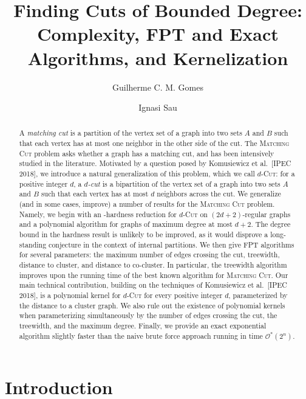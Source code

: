 \documentclass[a4paper,UKenglish,cleveref, autoref]{lipics-v2019}
\title{Finding Cuts of Bounded Degree: Complexity, FPT and Exact Algorithms, and Kernelization}
\author{Guilherme C. M. Gomes}{Universidade Federal de Minas Gerais, \and Departamento de Ciência da Computação, Belo Horizonte, Brazil}{gcm.gomes@dcc.ufmg.br}{https://orcid.org/0000-0002-5164-1460
}{Coordenação de Aperfeiçoamento de Pessoal de Nível Superior - Brasil (CAPES) - Finance Code 001.}%
\author{Ignasi Sau}{CNRS, LIRMM, Universit\'e de Montpellier, Montpellier, France}{ignasi.sau@lirmm.fr}{https://orcid.org/0000-0002-8981-9287
}{Projects DEMOGRAPH (ANR-16-CE40-0028) and ESIGMA (ANR-17-CE23-0010).}
\newcommand{\ig}[1]{\textcolor{red}{[Ig: #1]}}
\newcommand{\bigOs}[1]{\mathcal{O}^*\!\left(#1\right)}
\begin{document}
\maketitle

\begin{abstract}
A \emph{matching cut} is a partition of the vertex set of a graph into two sets $A$ and $B$ such that each vertex has at most one neighbor in the other side of the cut. The \textsc{Matching Cut} problem asks whether a graph has a matching cut, and has been intensively studied in the literature. Motivated by a question posed by Komusiewicz et al.~[IPEC 2018], we introduce a natural generalization of this problem, which we call \textsc{$d$-Cut}: for a positive integer $d$, a \emph{$d$-cut} is a bipartition of the vertex set of a graph into two sets $A$ and $B$ such that each vertex has at most $d$ neighbors across the cut.  We generalize (and in some cases, improve) a number of results for the \textsc{Matching Cut} problem. Namely, we begin with an \NP-hardness reduction for \textsc{$d$-Cut} on $(2d+2)$-regular graphs and a polynomial algorithm for graphs of maximum degree at most $d+2$. The degree bound in the hardness result is unlikely to be improved, as it would disprove a long-standing conjecture in the context of internal partitions. We then give {\sf FPT} algorithms for several parameters: the maximum number of edges crossing the cut, treewidth, distance to cluster, and distance to co-cluster. In particular, the treewidth algorithm improves upon the running time of the best known algorithm for \textsc{Matching Cut}. Our main technical contribution, building on the techniques of Komusiewicz et al.~[IPEC 2018], is a polynomial kernel for \textsc{$d$-Cut} for every positive integer $d$, parameterized by the distance to a cluster graph. We also rule out the existence of polynomial kernels when parameterizing simultaneously by the number of edges crossing the cut, the treewidth, and the maximum degree. Finally, we provide an exact exponential algorithm slightly faster than the naive brute force approach running in time $\bigOs{2^n}$.
\end{abstract}



\section{Introduction}
\label{sec:intro}
\end{document}
